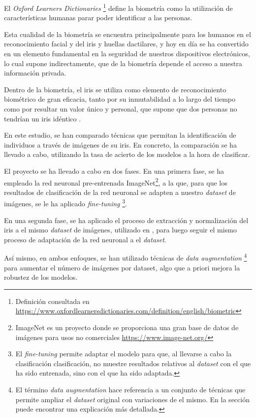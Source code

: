  \label{capitulo1}

El \textit{Oxford Learners Dictionaries} \footnote{Definición consultada en \url{https://www.oxfordlearnersdictionaries.com/definition/english/biometric}} define la biometría como la utilización de características humanas parar poder identificar a las personas.

Esta cualidad de la biometría se encuentra principalmente para los humanos en el reconocimiento facial y del iris y huellas dactilares, y hoy en día
se ha convertido en un elemento fundamental en la seguridad de nuestros dispositivos electrónicos, lo cual supone indirectamente,
que de la biometría depende el acceso a nuestra información privada.

Dentro de la biometría, el iris se utiliza como elemento de reconocimiento biométrico de gran eficacia, tanto por su inmutabilidad a lo largo del tiempo como por resultar un valor único y 
personal, que supone que dos personas no tendrían un iris idéntico \cite{malgheet_iris_2021}. 

En este estudio, se han comparado técnicas que permitan la identificación de individuos a través de imágenes de su iris. 
En concreto, la comparación se ha llevado a cabo, utilizando la tasa de acierto de los modelos a la hora de clasificar. 

El proyecto se ha llevado a cabo en dos fases. En una primera fase, se ha empleado la red neuronal pre-entrenada ImageNet\footnote{ImageNet es un proyecto donde se proporciona 
una gran base de datos de imágenes para usos no comerciales \url{https://www.image-net.org/}}, a la que, para que los resultados de clasificación de la red neuronal se adapten a nuestro \textit{dataset} de imágenes, se le ha aplicado \textit{fine-tuning} \footnote{El \textit{fine-tuning} 
permite adaptar el modelo para que, al llevarse a cabo la clasificación clasificación, no muestre resultados relativos al \textit{dataset} con el que ha sido entrenada, sino con el que ha sido adaptada.}.

En una segunda fase, se ha aplicado el proceso de extracción y normalización del iris a el mismo \textit{dataset} de imágenes, utilizado en \cite{tfg_iris_2020}, para luego seguir el mismo proceso de adaptación de la red neuronal
a el \textit{dataset}.

Así mismo, en ambos enfoques, se han utilizado técnicas de \textit{data augmentation} \footnote{El término \textit{data augmentation} hace referencia a un conjunto de técnicas que permite ampliar el \textit{dataset} original con variaciones de el mismo. En la sección  puede encontrar una explicación más detallada.} para aumentar el número de imágenes por dataset, algo que a priori mejora la robustez de los modelos.

